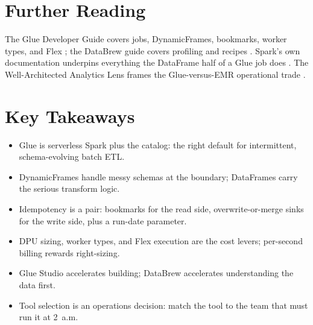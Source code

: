 \section{Further Reading}
The Glue Developer Guide covers jobs, DynamicFrames, bookmarks, worker types, and Flex \cite{awsGlueDocs}; the DataBrew guide covers profiling and recipes \cite{awsGlueDataBrewDocs}. Spark's own documentation underpins everything the DataFrame half of a Glue job does \cite{apacheSparkProject,zaharia2016apache}. The Well-Architected Analytics Lens frames the Glue-versus-EMR operational trade \cite{awsWellArchitectedAnalytics}.

\section*{Key Takeaways}
\begin{itemize}
    \item Glue is serverless Spark plus the catalog: the right default for intermittent, schema-evolving batch ETL.
    \item DynamicFrames handle messy schemas at the boundary; DataFrames carry the serious transform logic.
    \item Idempotency is a pair: bookmarks for the read side, overwrite-or-merge sinks for the write side, plus a run-date parameter.
    \item DPU sizing, worker types, and Flex execution are the cost levers; per-second billing rewards right-sizing.
    \item Glue Studio accelerates building; DataBrew accelerates understanding the data first.
    \item Tool selection is an operations decision: match the tool to the team that must run it at 2~a.m.
\end{itemize}

